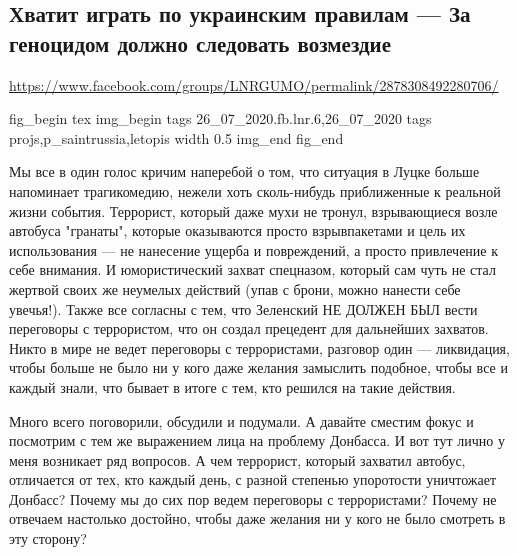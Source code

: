  
 
  
\clearpage
\subsection{Хватит играть по украинским правилам --- За геноцидом должно следовать возмездие}
\label{sec:26_07_2020.fb.lnr.6}
\url{https://www.facebook.com/groups/LNRGUMO/permalink/2878308492280706/}


\ifcmt
fig_begin 
  tex \centering
  img_begin 
    tags 26_07_2020.fb.lnr.6,26_07_2020
    tags projs,p_saintrussia,letopis
    width 0.5
  img_end
fig_end
\fi

Мы все в один голос кричим наперебой о том, что ситуация в Луцке больше
напоминает трагикомедию, нежели хоть сколь-нибудь приближенные к реальной жизни
события. Террорист, который даже мухи не тронул, взрывающиеся возле автобуса
"гранаты", которые оказываются просто взрывпакетами и цель их использования —
не нанесение ущерба и повреждений, а просто привлечение к себе внимания. И
юмористический захват спецназом, который сам чуть не стал жертвой своих же
неумелых действий (упав с брони, можно нанести себе увечья!). Также все
согласны с тем, что Зеленский НЕ ДОЛЖЕН БЫЛ вести переговоры с террористом, что
он создал прецедент для дальнейших захватов. Никто в мире не ведет переговоры с
террористами, разговор один --- ликвидация, чтобы больше не было ни у кого даже
желания замыслить подобное, чтобы все и каждый знали, что бывает в итоге с тем,
кто решился на такие действия.

Много всего поговорили, обсудили и подумали. А давайте сместим фокус и
посмотрим с тем же выражением лица на проблему Донбасса. И вот тут лично у меня
возникает ряд вопросов. А чем террорист, который захватил автобус, отличается
от тех, кто каждый день, с разной степенью упоротости уничтожает Донбасс?
Почему мы до сих пор ведем переговоры с террористами? Почему не отвечаем
настолько достойно, чтобы даже желания ни у кого не было смотреть в эту
сторону?

